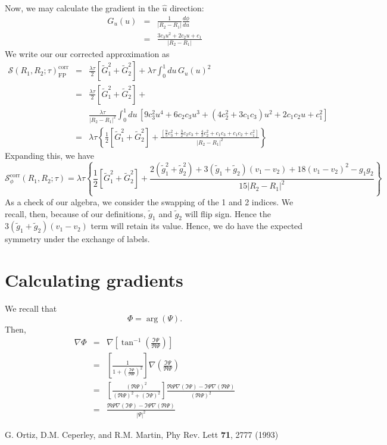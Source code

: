\documentclass{article}
\begin{document}
Now, we may calculate the gradient in the $\hat{u}$ direction:
\begin{eqnarray}
G_u(u) & = & \frac{1}{|R_2-R_1|} \frac{d\phi}{du} \\
& = & \frac{3c_3 u^2 + 2 c_2 u + c_1}{|R_2-R_1|}
\end{eqnarray}
We write our our corrected approximation as 
\begin{eqnarray}
\mathcal{S}(R_1,R_2;\tau)_\text{FP}^\text{corr} & = &
\frac{\lambda\tau}{2} \left[\tilde{G}_1^2 + \tilde{G}_2^2 \right]
+ \lambda\tau \int_0^1 du \, G_u(u)^2 \\
 & = & \frac{\lambda\tau}{2} \left[\tilde{G}_1^2 + \tilde{G}_2^2 \right]
+ \\
& & \frac{\lambda\tau}{|R_2-R_1|^2} \int_0^1 du\, 
\left[9c_3^2u^4 + 6c_2c_3u^3 +(4c_2^2 + 3c_1c_3)u^2 + 2c_1c_2u +
  c_1^2\right] \nonumber \\ 
& = & \lambda \tau \left\{ \frac{1}{2} \left[\tilde{G}_1^2 + \tilde{G}_2^2 \right] + \frac{\left[\frac{9}{5} c_3^2 + \frac{3}{2} c_2 c_3 + 
\frac{4}{3} c_2^2 + c_1 c_3 + c_1c_2 + c_1 ^2 \right]}{|R_2-R_1|^2} \right\}
\end{eqnarray}
Expanding this, we have
\begin{equation}
\mathcal{S}^\text{corr}_\phi(R_1, R_2; \tau)
= \lambda \tau \left\{
\frac{1}{2}\left[\tilde{G}_1^2 + \tilde{G}_2^2 \right]
+ \frac{2(\tilde{g}_1^2+\tilde{g}_2^2) + 3(\tilde{g}_1 +
  \tilde{g}_2)(v_1-v_2) + 18(v_1-v_2)^2 - g_1
  g_2}{15\left|R_2-R_1\right|^2}
\right\}
\end{equation}
As a check of our algebra, we consider the swapping of the
1 and 2 indices.  We recall, then, because of our definitions, $\tilde{g}_1$
and $\tilde{g}_2$ will flip sign.  Hence the $3(\tilde{g}_1 +
\tilde{g}_2)(v_1-v_2)$ term will retain its value.  Hence, we do have
the expected symmetry under the exchange of labels.

\section{Calculating gradients}
We recall that
\begin{equation}
\Phi = \arg (\Psi).
\end{equation}
Then,
\begin{eqnarray}
\nabla \Phi & = & \nabla \left[ \tan^{-1} \left(\frac{\Im \Psi}{\Re
    \Psi} \right) \right] \\
& = & \left[ \frac{1}{1 + \left(\frac{\Im \Psi}{\Re \Psi}\right)^2}
    \right] \nabla \left( \frac{\Im \Psi}{ \Re \Psi} \right) \\
& = & \left[\frac{(\Re \Psi)^2}{(\Re\Psi)^2 + (\Im \Psi)^2} \right]
\frac{\Re \Psi \nabla(\Im \Psi) - \Im \Psi \nabla (\Re \Psi)}{(\Re
    \Psi)^2} \\
& = & \frac{\Re \Psi \nabla(\Im \Psi) - \Im \Psi \nabla (\Re
    \Psi)}{\left| \Psi \right|^2}
\end{eqnarray}

\begin{thebibliography}{5}
 G. Ortiz, D.M. Ceperley, and R.M. Martin, Phy Rev. Lett {\bf
  71}, 2777 (1993)
\end{thebibliography}
\end{document}

